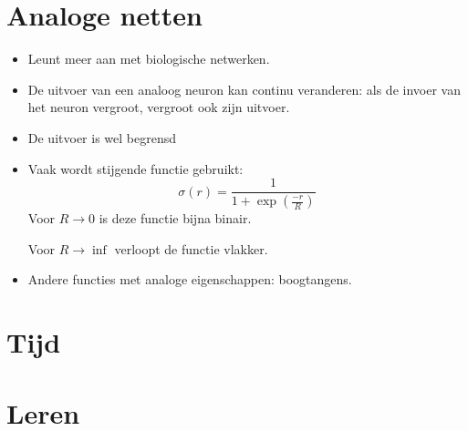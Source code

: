 \section{Analoge netten}
\begin{itemize}
    \item Leunt meer aan met biologische netwerken.
    \item De uitvoer van een analoog neuron kan continu veranderen: als de invoer van het neuron vergroot, vergroot ook zijn uitvoer.
    \item De uitvoer is wel begrensd
    \item Vaak wordt stijgende functie gebruikt:
    $$\sigma(r) = \frac{1}{1 + \exp(\frac{-r}{R})}$$
    Voor $R \rightarrow 0$ is deze functie bijna binair. 

    Voor $R \rightarrow \inf$ verloopt de functie vlakker.
    \item Andere functies met analoge eigenschappen: boogtangens.
\end{itemize}

\section{Tijd}

\section{Leren}
